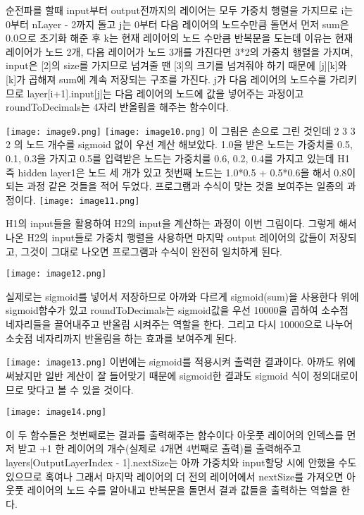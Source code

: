 \documentclass[12pt,a4paper]{article}
\begin{document}
순전파를 할때 input부터 output전까지의 레이어는 모두 가중치 행렬을 가지므로
i는 0부터 nLayer - 2까지 돌고 j는 0부터 다음 레이어의 노드수만큼 돌면서
먼저 sum은 0.0으로 초기화 해준 후
k는 현재 레이어의 노드 수만큼 반복문을 도는데
이유는 현재 레이어가 노드 2개, 다음 레이어가 노드 3개를 가진다면
3*2의 가중치 행렬을 가지며, input은 [2]의 size를 가지므로
넘겨줄 땐 [3]의 크기를 넘겨줘야 하기 때문에
[j][k]와 [k]가 곱해져 sum에 계속 저장되는 구조를 가진다.
j가 다음 레이어의 노드수를 가리키므로 layer[i+1].input[j]는 다음 레이어의 노드에
값을 넣어주는 과정이고 roundToDecimals는 4자리 반올림을 해주는 함수이다.

\texttt{[image: image9.png]}
\texttt{[image: image10.png]}
이 그림은 손으로 그린 것인데 2 3 3 2 의 노드 개수를 sigmoid 없이 우선 계산 해보았다.
1.0을 받은 노드는 가중치를 0.5, 0.1, 0.3을 가지고
0.5를 입력받은 노드는 가중치를 0.6, 0.2, 0.4를 가지고 있는데 
H1 즉 hidden layer1은 노드 세 개가 있고
첫번째 노드는 1.0*0.5 + 0.5*0.6을 해서 0.8이 되는 과정 같은 것들을 적어 두었다.
프로그램과 수식이 맞는 것을 보여주는 일종의 과정이다.
\texttt{[image: image11.png]}

H1의 input들을 활용하여 H2의 input을 계산하는 과정이 이번 그림이다.
그렇게 해서 나온 H2의 input들로 가중치 행렬을 사용하면
마지막 output 레이어의 값들이 저장되고, 그것이 그대로 나오면 프로그램과
수식이 완전히 일치하게 된다.

\texttt{[image: image12.png]}

실제로는 sigmoid를 넣어서 저장하므로 아까와 다르게 sigmoid(sum)을 사용한다
위에 sigmoid함수가 있고 roundToDecimals는 sigmoid값을 우선 10000을 곱하여
소수점 네자리들을 끌어내주고 반올림 시켜주는 역할을 한다.
그리고 다시 10000으로 나누어 소숫점 네자리까지 반올림을 하는 효과를 보여주게 된다.

\texttt{[image: image13.png]}
이번에는 sigmoid를 적용시켜 출력한 결과이다.
아까도 위에 써놨지만 일반 계산이 잘 들어맞기 때문에
sigmoid한 결과도 sigmoid 식이 정의대로이므로 맞다고 볼 수 있을 것이다.

\texttt{[image: image14.png]}

이 두 함수들은 첫번째로는 결과를 출력해주는 함수이다
아웃풋 레이어의 인덱스를 먼저 받고
+1 한 레이어의 개수(실제로 4개면 4번째로 출력)를 출력해주고
layers[OutputLayerIndex - 1].nextSize는
아까 가중치와 input할당 시에 안했을 수도 있으므로 혹여나
그래서 마지막 레이어의 더 전의 레이어에서 nextSize를 가져오면
아웃풋 레이어의 노드 수를 알아내고
반복문을 돌면서 결과 값들을 출력하는 역할을 한다.
\end{document}
